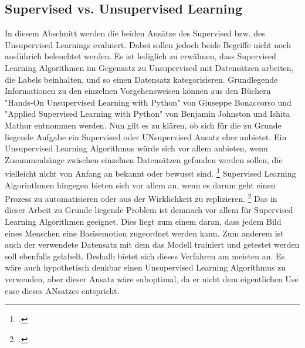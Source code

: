\documentclass[12pt, a4paper]{scrbook}
\begin{document}
\subsection{Supervised vs. Unsupervised Learning}
In diesem Abschnitt werden die beiden Ansätze des Supervised bzw. des Unsupervised Learnings evaluiert. Dabei sollen jedoch beide Begriffe nicht noch ausführich beleuchtet werden. Es ist lediglich zu erwähnen, dass Supervised Learning Algorithmen im Gegensatz zu Unsupervised mit Datensätzen arbeiten, die Labels beinhalten, und so einen Datensatz kategorisieren.  Grundlegende Informationen zu den einzelnen Vorgehensweisen  können aus den Büchern "Hands-On Unsupervised Learning with Python" von Giuseppe Bonaccorso und "Applied Supervised Learning with Python" von Benjamin Johnston und Ishita Mathur entnommen werden.
Nun gilt es zu klären, ob sich für die zu Grunde liegende Aufgabe ein Supervised oder UNsupervised Ansatz eher anbietet. Ein Unsupervised Learning Algorithmus würde sich vor allem anbieten, wenn Zusammenhänge zwischen einzelnen Datensätzen gefunden werden sollen, die vielleicht nicht von Anfang an bekannt oder bewusst sind.
\footcite[Vgl. ][21]{Unsupervised}
 Supervised Learning Algoriuthmen hingegen bieten sich vor allem an, wenn es darum geht einen Prozess zu automatisieren oder aus der Wirklichkeit zu replizieren.
\footcite[Vgl. ][4]{Supervised}
Das in dieser Arbeit zu Grunde liegende Problem ist demnach vor allem für Supervised Learning Algorithmen geeignet. Dies liegt zum einem daran, dass jedem Bild eines Menschen eine Basisemotion zugeordnet werden kann. Zum anderem ist auch der verwendete Datensatz mit dem das Modell trainiert und getestet werden soll ebenfalls gelabelt. Deshalb bietet sich dieses Verfahren am meisten an. Es wäre auch hypothetisch denkbar einen Unsupervised Learning Algorithmus zu verwenden, aber dieser Ansatz wäre suboptimal, da er nicht dem eigentlichen Use case dieses ANsatzes entspricht.


\let\cleardoublepage\relax
\end{document}
